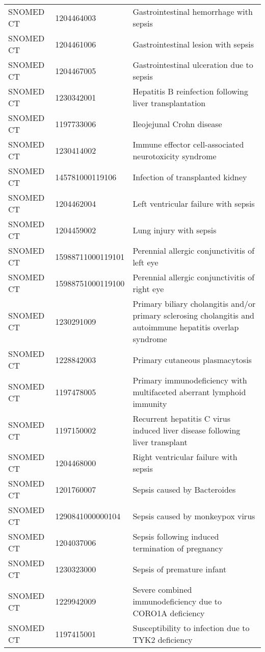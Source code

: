 \begin{longtable}{p{}p{}p{}}
  SNOMED CT & 1204464003 & Gastrointestinal hemorrhage with sepsis \\ 
  SNOMED CT & 1204461006 & Gastrointestinal lesion with sepsis \\ 
  SNOMED CT & 1204467005 & Gastrointestinal ulceration due to sepsis \\ 
  SNOMED CT & 1230342001 & Hepatitis B reinfection following liver transplantation \\ 
  SNOMED CT & 1197733006 & Ileojejunal Crohn disease \\ 
  SNOMED CT & 1230414002 & Immune effector cell-associated neurotoxicity syndrome \\ 
  SNOMED CT & 145781000119106 & Infection of transplanted kidney \\ 
  SNOMED CT & 1204462004 & Left ventricular failure with sepsis \\ 
  SNOMED CT & 1204459002 & Lung injury with sepsis \\ 
  SNOMED CT & 15988711000119101 & Perennial allergic conjunctivitis of left eye \\ 
  SNOMED CT & 15988751000119100 & Perennial allergic conjunctivitis of right eye \\ 
  SNOMED CT & 1230291009 & Primary biliary cholangitis and/or primary sclerosing cholangitis and autoimmune hepatitis overlap syndrome \\ 
  SNOMED CT & 1228842003 & Primary cutaneous plasmacytosis \\ 
  SNOMED CT & 1197478005 & Primary immunodeficiency with multifaceted aberrant lymphoid immunity \\ 
  SNOMED CT & 1197150002 & Recurrent hepatitis C virus induced liver disease following liver transplant \\ 
  SNOMED CT & 1204468000 & Right ventricular failure with sepsis \\ 
  SNOMED CT & 1201760007 & Sepsis caused by Bacteroides \\ 
  SNOMED CT & 1290841000000104 & Sepsis caused by monkeypox virus \\ 
  SNOMED CT & 1204037006 & Sepsis following induced termination of pregnancy \\ 
  SNOMED CT & 1230323000 & Sepsis of premature infant \\ 
  SNOMED CT & 1229942009 & Severe combined immunodeficiency due to CORO1A deficiency \\ 
  SNOMED CT & 1197415001 & Susceptibility to infection due to TYK2 deficiency \\ 

\end{longtable}
